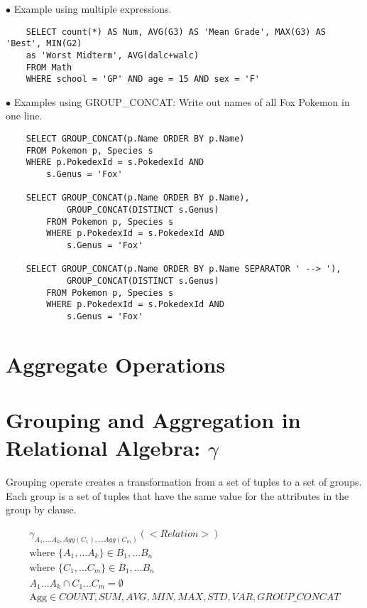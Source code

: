 \documentclass[twoside]{article}
\begin{document}
$\bullet$ Example using multiple expressions.
\begin{verbatim}
    SELECT count(*) AS Num, AVG(G3) AS 'Mean Grade', MAX(G3) AS 'Best', MIN(G2)
    as 'Worst Midterm', AVG(dalc+walc)
    FROM Math
    WHERE school = 'GP' AND age = 15 AND sex = 'F'
\end{verbatim}

$\bullet$ Examples using GROUP\_CONCAT: Write out names of all Fox Pokemon in
one line.
\begin{verbatim}
    SELECT GROUP_CONCAT(p.Name ORDER BY p.Name)
    FROM Pokemon p, Species s
    WHERE p.PokedexId = s.PokedexId AND
        s.Genus = 'Fox'
        
    SELECT GROUP_CONCAT(p.Name ORDER BY p.Name),
            GROUP_CONCAT(DISTINCT s.Genus)
        FROM Pokemon p, Species s
        WHERE p.PokedexId = s.PokedexId AND
            s.Genus = 'Fox'
            
    SELECT GROUP_CONCAT(p.Name ORDER BY p.Name SEPARATOR ' --> '),
            GROUP_CONCAT(DISTINCT s.Genus)
        FROM Pokemon p, Species s
        WHERE p.PokedexId = s.PokedexId AND
            s.Genus = 'Fox'
\end{verbatim}

\newpage
\section{Aggregate Operations}

\section*{Grouping and Aggregation in Relational Algebra: $\gamma$}

Grouping operate creates a transformation from a set of tuples to a set of
groups. Each group is a set of tuples that have the same value for the
attributes in the group by clause.

\begin{gather*}
    \gamma_{A_1,\dots A_k, Agg(C_1),\dots Agg(C_m)}(<Relation>) \\
    \text{where } \{A_1,\dots A_k\} \in {B_1, \dots B_n} \\
    \text{where } \{C_1,\dots C_m\} \in {B_1, \dots B_n} \\
    {A_1 \dots A_k} \cap {C_1 \dots C_m} = \emptyset \\
    \text{Agg} \in {COUNT, SUM, AVG, MIN, MAX, STD, VAR, GROUP\_CONCAT} \\
\end{gather*}
\end{document}

